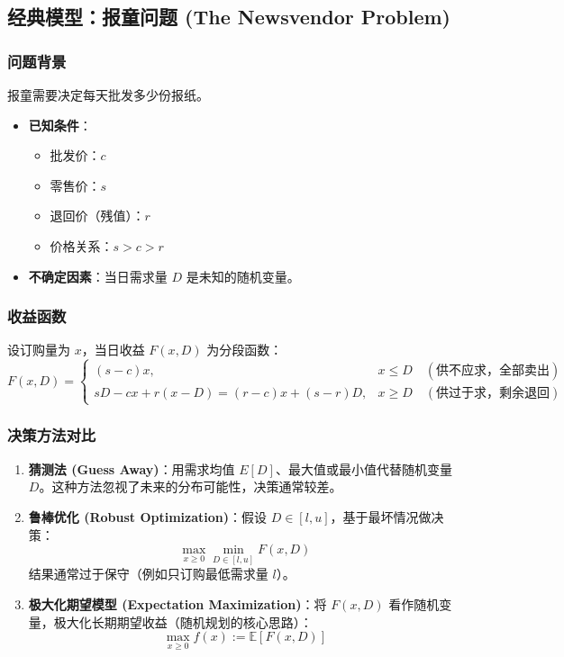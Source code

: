 \documentclass[a4paper,12pt]{ctexart} %
\begin{document}
	\subsection{ 经典模型：报童问题 (The Newsvendor Problem)}
	
	\subsubsection{ 问题背景}
	报童需要决定每天批发多少份报纸。
	\begin{itemize}
		\item \textbf{已知条件}：
		\begin{itemize}
			\item 批发价：$c$
			\item 零售价：$s$
			\item 退回价（残值）：$r$
			\item 价格关系：$s > c > r$
		\end{itemize}
		\item \textbf{不确定因素}：当日需求量 $D$ 是未知的随机变量。
	\end{itemize}
	
	\subsubsection{ 收益函数}
	设订购量为 $x$，当日收益 $F(x, D)$ 为分段函数：
	\begin{equation}
		F(x,D)=\begin{cases}
			(s-c)x, & x\le D \quad (\text{供不应求，全部卖出})\\
			sD-cx+r(x-D)=(r-c)x+(s-r)D, & x\ge D \quad (\text{供过于求，剩余退回})
		\end{cases}
	\end{equation}
	
	\subsubsection{ 决策方法对比}
	\begin{enumerate}
		\item \textbf{猜测法 (Guess Away)}：用需求均值 $E[D]$、最大值或最小值代替随机变量 $D$。这种方法忽视了未来的分布可能性，决策通常较差。
		\item \textbf{鲁棒优化 (Robust Optimization)}：假设 $D \in [l, u]$，基于最坏情况做决策：
		\[
		\max_{x\ge0} \min_{D\in[l,u]} F(x,D)
		\]
		结果通常过于保守（例如只订购最低需求量 $l$）。
		\item \textbf{极大化期望模型 (Expectation Maximization)}：将 $F(x, D)$ 看作随机变量，极大化长期期望收益（随机规划的核心思路）：
		\[
		\max_{x\ge0} f(x) := \mathbb{E}[F(x,D)]
		\]
	\end{enumerate}
	
\end{document}

